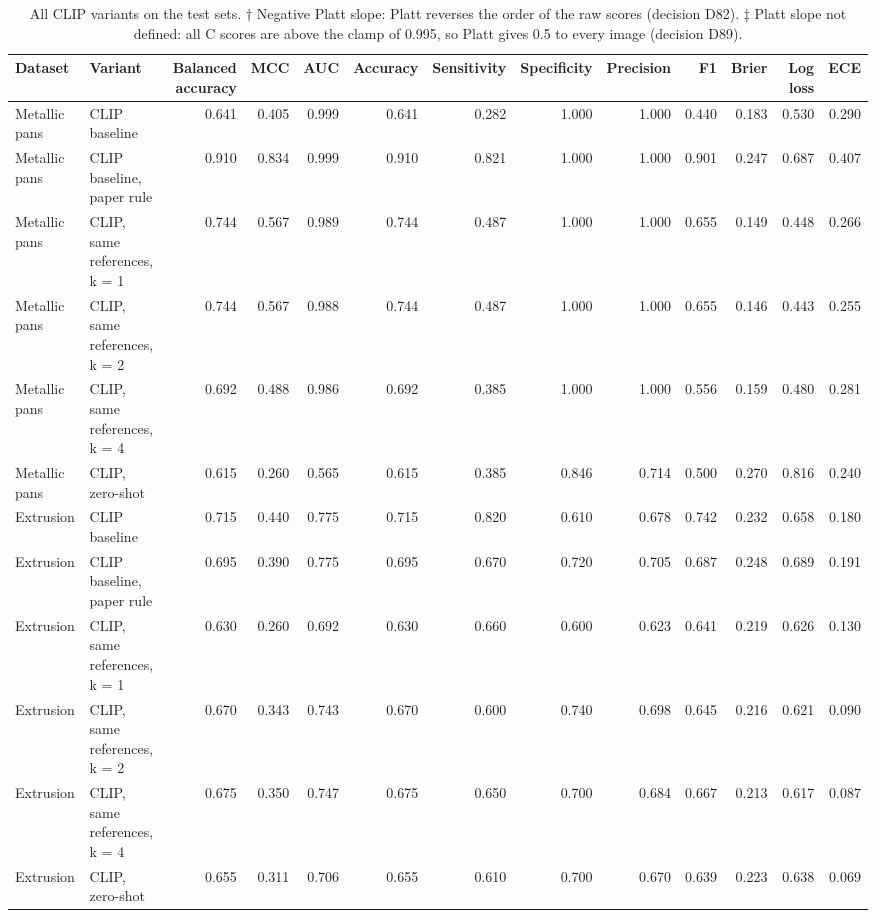 \begin{table}

\caption{\label{tab:tbl-clip}All CLIP variants on the test sets. † Negative Platt slope: Platt reverses the order of the raw scores (decision D82). ‡ Platt slope not defined: all C scores are above the clamp of 0.995, so Platt gives 0.5 to every image (decision D89).}
\centering
\begin{tabular}[t]{llrrrrrrrrrrr}
\toprule
Dataset & Variant & Balanced accuracy & MCC & AUC & Accuracy & Sensitivity & Specificity & Precision & F1 & Brier & Log loss & ECE\\
\midrule
Metallic pans & CLIP baseline & 0.641 & 0.405 & 0.999 & 0.641 & 0.282 & 1.000 & 1.000 & 0.440 & 0.183 & 0.530 & 0.290\\
Metallic pans & CLIP baseline, paper rule & 0.910 & 0.834 & 0.999 & 0.910 & 0.821 & 1.000 & 1.000 & 0.901 & 0.247 & 0.687 & 0.407\\
Metallic pans & CLIP, same references, k = 1 & 0.744 & 0.567 & 0.989 & 0.744 & 0.487 & 1.000 & 1.000 & 0.655 & 0.149 & 0.448 & 0.266\\
Metallic pans & CLIP, same references, k = 2 & 0.744 & 0.567 & 0.988 & 0.744 & 0.487 & 1.000 & 1.000 & 0.655 & 0.146 & 0.443 & 0.255\\
Metallic pans & CLIP, same references, k = 4 & 0.692 & 0.488 & 0.986 & 0.692 & 0.385 & 1.000 & 1.000 & 0.556 & 0.159 & 0.480 & 0.281\\
\addlinespace
Metallic pans & CLIP, zero-shot & 0.615 & 0.260 & 0.565 & 0.615 & 0.385 & 0.846 & 0.714 & 0.500 & 0.270 & 0.816 & 0.240\\
Extrusion & CLIP baseline & 0.715 & 0.440 & 0.775 & 0.715 & 0.820 & 0.610 & 0.678 & 0.742 & 0.232 & 0.658 & 0.180\\
Extrusion & CLIP baseline, paper rule & 0.695 & 0.390 & 0.775 & 0.695 & 0.670 & 0.720 & 0.705 & 0.687 & 0.248 & 0.689 & 0.191\\
Extrusion & CLIP, same references, k = 1 & 0.630 & 0.260 & 0.692 & 0.630 & 0.660 & 0.600 & 0.623 & 0.641 & 0.219 & 0.626 & 0.130\\
Extrusion & CLIP, same references, k = 2 & 0.670 & 0.343 & 0.743 & 0.670 & 0.600 & 0.740 & 0.698 & 0.645 & 0.216 & 0.621 & 0.090\\
\addlinespace
Extrusion & CLIP, same references, k = 4 & 0.675 & 0.350 & 0.747 & 0.675 & 0.650 & 0.700 & 0.684 & 0.667 & 0.213 & 0.617 & 0.087\\
Extrusion & CLIP, zero-shot & 0.655 & 0.311 & 0.706 & 0.655 & 0.610 & 0.700 & 0.670 & 0.639 & 0.223 & 0.638 & 0.069\\

\end{tabular}
\end{table}
